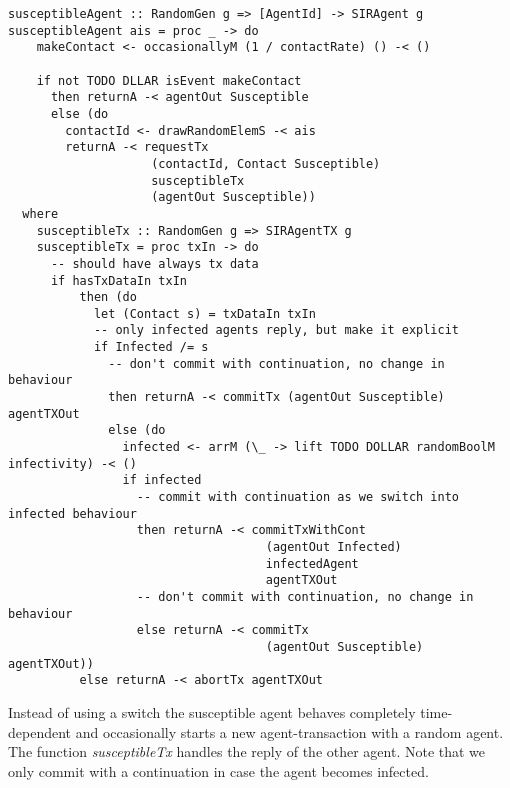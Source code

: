 \begin{verbatim}
susceptibleAgent :: RandomGen g => [AgentId] -> SIRAgent g
susceptibleAgent ais = proc _ -> do
    makeContact <- occasionallyM (1 / contactRate) () -< ()

    if not TODO DLLAR isEvent makeContact
      then returnA -< agentOut Susceptible
      else (do
        contactId <- drawRandomElemS -< ais
        returnA -< requestTx 
                    (contactId, Contact Susceptible) 
                    susceptibleTx
                    (agentOut Susceptible))
  where
    susceptibleTx :: RandomGen g => SIRAgentTX g
    susceptibleTx = proc txIn -> do
      -- should have always tx data
      if hasTxDataIn txIn 
          then (do
            let (Contact s) = txDataIn txIn 
            -- only infected agents reply, but make it explicit
            if Infected /= s
              -- don't commit with continuation, no change in behaviour
              then returnA -< commitTx (agentOut Susceptible) agentTXOut
              else (do
                infected <- arrM (\_ -> lift TODO DOLLAR randomBoolM infectivity) -< ()
                if infected
                  -- commit with continuation as we switch into infected behaviour
                  then returnA -< commitTxWithCont 
                                    (agentOut Infected) 
                                    infectedAgent
                                    agentTXOut
                  -- don't commit with continuation, no change in behaviour
                  else returnA -< commitTx 
                                    (agentOut Susceptible) agentTXOut))
          else returnA -< abortTx agentTXOut
\end{verbatim}

Instead of using a switch the susceptible agent behaves completely time-dependent and occasionally starts a new agent-transaction with a random agent. The function \textit{susceptibleTx} handles the reply of the other agent. Note that we only commit with a continuation in case the agent becomes infected.

